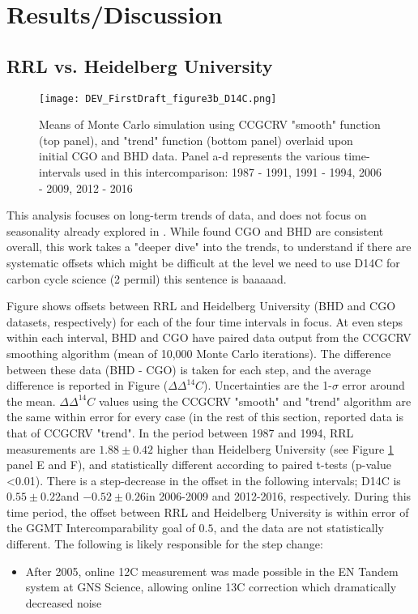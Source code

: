 \documentclass{article}
\begin{document}
\newpage
\section{Results/Discussion}

\subsection{RRL vs. Heidelberg University}

\begin{figure}[h!]
  \texttt{[image: DEV\_FirstDraft\_figure3b\_D14C.png]}
  \caption{Means of Monte Carlo simulation using CCGCRV "smooth" function (top panel), and "trend" function (bottom panel) overlaid upon initial CGO and BHD data. Panel a-d represents the various time-intervals used in this intercomparison: 1987 - 1991, 1991 - 1994, 2006 - 2009, 2012 - 2016}
  \label{fig:results1}
\end{figure}
This analysis focuses on long-term trends of data, and does not focus on seasonality already explored in \cite{turnbull2017}. While \cite{turnbull2017} found CGO and BHD are consistent overall, this work takes a "deeper dive" into the trends, to understand if there are systematic offsets which might be difficult at the level we need to use D14C for carbon cycle science (2 permil) this sentence is baaaaad.

Figure shows offsets between RRL and Heidelberg University (BHD and CGO datasets, respectively) for each of the four time intervals in focus. At even steps within each interval, BHD and CGO have paired data output from the CCGCRV smoothing algorithm (mean of 10,000 Monte Carlo iterations). The difference between these data (BHD - CGO) is taken for each step, and the average difference is reported in Figure  (${\Delta\Delta^{14}C}$). Uncertainties are the 1-$\sigma$ error around the mean.
${\Delta\Delta^{14}C}$ values using the CCGCRV "smooth" and "trend" algorithm are the same within error for every case (in the rest of this section, reported data is that of CCGCRV "trend". In the period between 1987 and 1994, RRL measurements are $1.88\pm0.42$ higher than Heidelberg University (see Figure \ref{fig:results1} panel E and F), and statistically different according to paired t-tests (p-value <0.01). 
There is a step-decrease in the offset in the following intervals; D14C is  $0.55\pm0.22$\textperthousand and $-0.52\pm0.26$\textperthousand in 2006-2009 and 2012-2016, respectively. During this time period, the offset between RRL and Heidelberg University is within error of the GGMT Intercomparability goal of $0.5$\textperthousand, and the data are not statistically different. 
The following is likely responsible for the step change: 
\begin{itemize}

	\item After 2005, online 12C measurement was made possible in the EN Tandem system at GNS Science, allowing online 13C correction which dramatically decreased noise \cite{turnbull2017}
\end{itemize}
\end{document}
